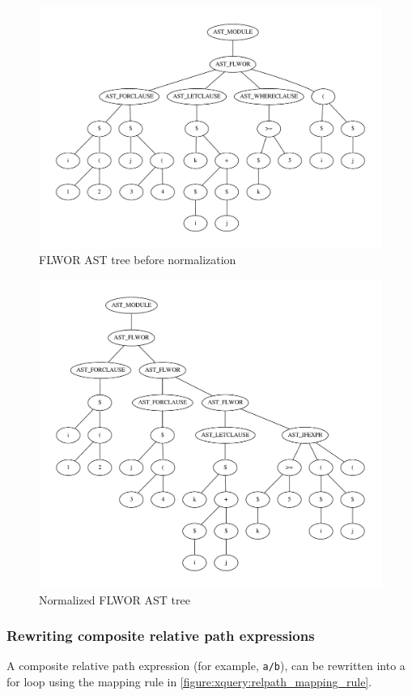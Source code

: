 \begin{figure}[h!]
\centering
 \includegraphics[scale=0.50]{img/graphs/flwor_rewrite1}
\caption{FLWOR AST tree before normalization}
\label{tree:ast:flwor_rewrite1}
\end{figure}

\begin{figure}[h!]
\centering
 \includegraphics[scale=0.50]{img/graphs/flwor_rewrite2}
\caption{Normalized FLWOR AST tree}
\label{tree:ast:flwor_rewrite2}
\end{figure}

\subsubsection{Rewriting composite relative path expressions}
A composite relative path expression (for example, \verb!a/b!), can be
rewritten into a for loop using the mapping rule in
\ref{figure:xquery:relpath_mapping_rule}.

